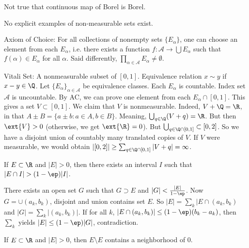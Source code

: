 Not true that continuous map of Borel is Borel. 


No explicit examples of non-measurable sets exist. 


Axiom of Choice: For all collections of nonempty sets $\{E_\alpha\}$, one can choose an element from each $E_\alpha$, i.e. there exists a function $f: \mathcal{A} \to \bigcup E_\alpha$ such that $f(\alpha) \in E_\alpha$ for all $\alpha$. Said differently, $\prod_{\alpha \in \mathcal{A}} E_\alpha \neq \emptyset$. 



Vitali Set: A nonmeasurable subset of $[0,1]$. Equivalence relation $x \sim y$ if $x-y \in \Q$. Let $\{E_\alpha\}_{\alpha \in \mathcal{A}}$ be equivalence classes. Each $E_\alpha$ is countable. Index set $\mathcal{A}$ is uncountable. By AC, we can prove one element from each $E_\alpha \cap [0,1]$. This gives a set $V \subset [0,1]$. We claim that $V$ is nonmeasurable. Indeed, $V+\Q=\R$, in that $A \pm B =\{ a \pm b \colon a \in A, b \in B\}$. Meaning, $\bigcup_{q \in \Q} (V+q)=\R$. But then $\ext{V}>0$ (otherwise, we get $\ext{\R}=0$). But $\bigcup_{q \in \Q \cap [0,1]} \subset [0,2]$. So we have a disjoint union of countably many translated copies of $V$. If $V$ were measurable, we would obtain $|[0,2]| \geq \sum_{q \in \Q \cap [0,1]} |V+q|= \infty$. 



\begin{lem} \label{lem:density}
If $E \subset \R$ and $|E|>0$, then there exists an interval $I$ such that $|E \cap I|> (1-\ep) |I|$. 
\end{lem}

\pf There exists an open set $G$ such that $G \supset E$ and $|G|< \frac{|E|}{1-\ep}$. Now $G= \cup (a_k,b_k)$, disjoint and union contains set $E$. So $|E|= \sum_k |E \cap (a_k,b_k)$ and $|G|= \sum_k |(a_k,b_k)|$. If for all $k$, $| E \cap (a_k,b_k)| \leq (1- \ep)(b_k-a_k)$, then $\sum_k$ yields $|E| \leq (1-\ep)|G|$, contradiction. 



\begin{lem} \label{lem:subzero}
If $E \subset \R$ and $|E|>0$, then $E \setminus E$ contains a neighborhood of 0. 
\end{lem}


